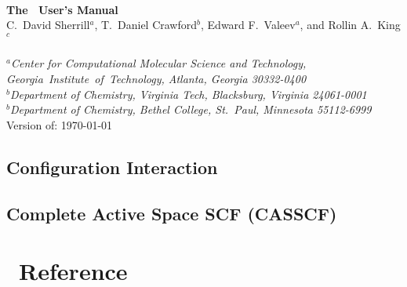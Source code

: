 \documentclass[12pt]{article}
\begin{document}


\begin{center}
\ \\
\vspace{2.0in}
{\bf {\Large The \PSIthree\ User's Manual}} \\
\vspace{0.5in}
C.~David Sherrill$^a$, T.~Daniel Crawford$^b$, Edward F.~Valeev$^a$, and
Rollin A.~King$^c$\\
\ \\
{\em $^a$Center for Computational Molecular Science and Technology, 
  \mbox{Georgia Institute of Technology,} Atlanta, Georgia 30332-0400} \\
\vspace{0.1in}
{\em $^b$Department of Chemistry, Virginia Tech, Blacksburg, Virginia 
  24061-0001} \\
\vspace{0.1in}
{\em $^b$Department of Chemistry, Bethel College, St.\ Paul, Minnesota 
  55112-6999}
\ \\
\vspace{0.3in}
Version of: \today
\end{center}

\thispagestyle{empty}

\newpage
\newpage





  
  
  
  \subsection{Configuration Interaction}
  \subsection{Complete Active Space SCF (CASSCF)}



\newpage
\appendix
\section{\PSIthree\ Reference}\label{PSI_Reference}
%

%



\end{document}
